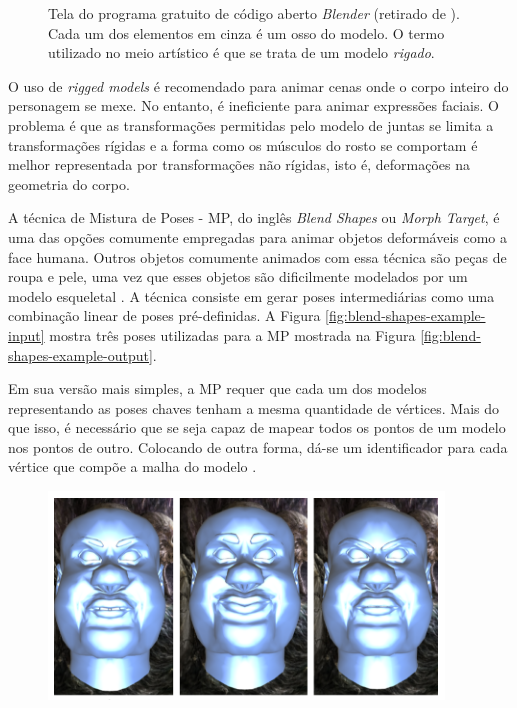 {\begin{figure}[!htb]
  \caption{ Tela do programa gratuito de código aberto \textit{Blender} (retirado de \cite{rigs-tutorial}). Cada um dos elementos em cinza é um osso do modelo. O termo utilizado no meio artístico é que se trata de um modelo \textit{rigado}.}

\label{fig:rigged-models} 
\end{figure}
    
    O uso de \textit{rigged models} é recomendado para animar cenas onde o corpo inteiro do personagem se mexe. No entanto, é ineficiente para animar expressões faciais. O problema é que as transformações permitidas pelo modelo de juntas se limita a transformações rígidas e a forma como os músculos do rosto se comportam é melhor representada por transformações não rígidas, isto é, deformações na geometria do corpo.
    
    A técnica de  Mistura de Poses - MP, do inglês \textit{Blend Shapes} ou \textit{Morph Target}, é uma das opções comumente empregadas para animar objetos deformáveis como a face humana. Outros objetos comumente animados com essa técnica são peças de roupa e pele, uma vez que esses objetos são dificilmente modelados por um modelo esqueletal \cite{master-thesis-on-blend-shapes}. A técnica consiste em gerar poses intermediárias como uma combinação linear de poses pré-definidas. A Figura \ref{fig:blend-shapes-example-input} mostra três poses utilizadas para a MP mostrada na Figura \ref{fig:blend-shapes-example-output}.
    
    Em sua versão mais simples, a MP requer que cada um dos modelos representando as poses chaves tenham a mesma quantidade de vértices. Mais do que isso, é necessário que se seja capaz de mapear todos os pontos de um modelo nos pontos de outro. Colocando de outra forma, dá-se um identificador para cada vértice que compõe a malha do modelo \cite{tutorial-supremo-on-blend-shapes}.    
    
\FloatBarrier
\begin{figure}[!htb]
   \centering
  \includegraphics[width=0.7\linewidth]{./figs/inputToBlendShapes.png}


\end{figure}}

